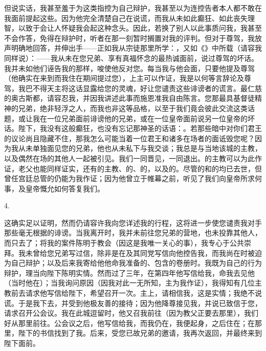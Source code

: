 但说实话，我甚至羞于为这类指控为自己辩护，我甚至以为连控告者本人都不敢在我面前提起这些。因为他完全清楚自己在说谎，而我从未如此癫狂、如此丧失理智，以致于会让人怀疑我会起这种念头。因此，若换了别人以此事质问我，我甚至不会作答，免得在辩护时，听者在那一刻暂时搁置对我的评判。但对于尊驾，我放声明确地回答，并伸出手——正如我从宗徒那里所学：，又如《》中所载（请容我同样说）：——我从未在您兄弟、享有真福怀念的最热诚面前，说过尊驾的坏话。我并未如他们诬告我的那样，唆使他反对您。每当我与他会面，只要他提及尊驾（他确实在来到而我住在期间提过您），上主可以作证，我是以何等言辞论及尊驾，我巴不得天主将这话显露给您的灵魂，好让您谴责这些诽谤者的谎言。最仁慈的奥古斯都，请容忍我，并因我讲述此事而施恩准我自由陈言。您那最具基督徒精神的兄弟，绝非轻浮之人，而我也非这等品格，以至于我们竟会彼此交流这类话题，或让我在一位兄弟面前诽谤他的兄弟，或在一位皇帝面前说另一位皇帝的坏话。陛下，我没有这般癫狂，也没有忘记那神圣的话语：。若那些暗中对你们君王的议论尚且隐藏不住，那我怎么可能当着一位君王和诸多在场者的面诋毁您呢？因为我从未单独面见您的兄弟，他也从未私下与我交谈；我总是与当地该城的主教，以及偶然在场的其他人一起被引见。我们一同晋见，一同退出。的主教可以为此作证，老父也能同样证实，还有的主教、的、的，以及的。尽管的和的均已去世，但曾任宫廷总管的仍能为我作证；因为他曾立于帷幕之前，听见了我们向皇帝所求何事，及皇帝慨允如何答复我们。\par

4. \par

这确实足以证明，然而仍请容许我向您详述我的行程，这将进一步使您谴责我对手那些毫无根据的诽谤。当我离开时，我并未前往您兄弟的营地，也未投靠其他人，而只去了；将我的案件陈明于教会（因这是我唯一关心的事），我专心于公共崇拜。我未曾给您兄弟写过信，除非是在及其同党写信向他控告我，而我尚在时被迫为自己辩护；以及后来我寄给他他命我准备的、包含的卷册时。我既为自己的行为辩护，理当向陛下陈明实情。然而过了三年，在第四年他写信给我，命我去见他（当时他在）；当我询问原因（因我对此一无所知，主为我作证），我得知有几位主教前去请求他写信给陛下，希望召开一次。主上，请相信我，这是实情；我绝不说谎。于是我下去，并受到他极友善的接待；因为他降尊接见我，并说已致信于您，请求召开公会议。我在此城逗留时，他又召我前往（因为教父正要去那里），我们好从那里前往。公会议之后，他写信给我，而我仍在，我便起身，之后住在；在那里，陛下的书信找到了我。后来，受您已故兄弟的邀请，我再次返回，并最终来到陛下面前。\par

